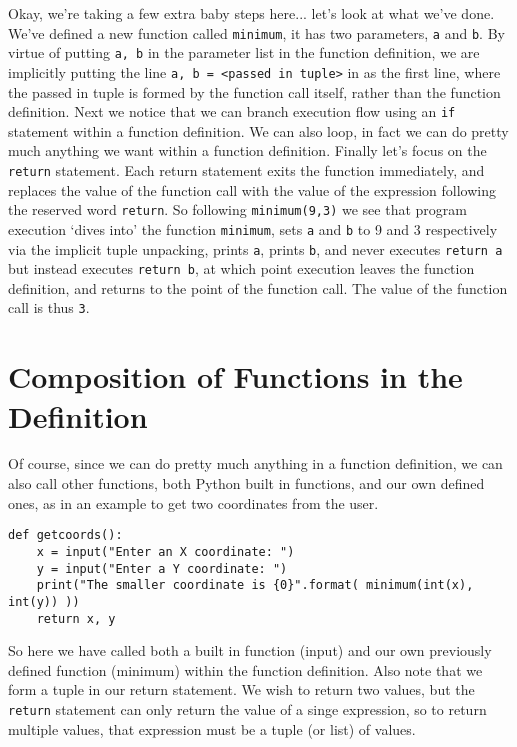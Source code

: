 Okay, we're taking a few extra baby steps here... let's look at what   we've done. We've defined a new function called \texttt{minimum}, it has two   parameters, \texttt{a} and \texttt{b}. By virtue of putting 
\texttt{a, b} in the   parameter list in the function definition, we are implicitly putting   the line 
\texttt{a, b = <passed in tuple>} in as the first   line, where the passed in tuple is formed by the function call itself,   rather than the function definition. Next we notice that we can branch   execution flow using an \texttt{if} statement within a function definition. We   can also loop, in fact we can do pretty much anything we want within a   function definition. Finally let's focus on the \texttt{return} statement.   Each return statement exits the function immediately, and replaces the   value of the function call with the value of the expression following   the reserved word \texttt{return}. So following 
\texttt{minimum(9,3)} we   see that program execution `dives into' the function \texttt{minimum}, sets   \texttt{a} and \texttt{b} to 9 and 3 respectively via the implicit tuple unpacking,   prints \texttt{a}, prints \texttt{b}, and never executes 
\texttt{return a} but   instead executes 
\texttt{return b}, at which point execution leaves   the function definition, and returns to the   point of the function call. The value of the function call is thus   \texttt{3}.

\section{Composition of Functions in the Definition}

Of course, since we can do pretty much anything in a function   definition, we can also call other functions, both Python built in   functions, and our own defined ones, as in an example to get two   coordinates from the user.
\begin{lstlisting}
def getcoords():
    x = input("Enter an X coordinate: ")
    y = input("Enter a Y coordinate: ")
    print("The smaller coordinate is {0}".format( minimum(int(x), int(y)) ))
    return x, y
\end{lstlisting}

So here we have called both a built in function (input) and our   own previously defined function (minimum) within the function   definition. Also note that we form a tuple in our return statement. We   wish to return two values, but the \texttt{return} statement can only return   the value of a singe expression, so to return multiple values, that   expression must be a tuple (or list) of values.

